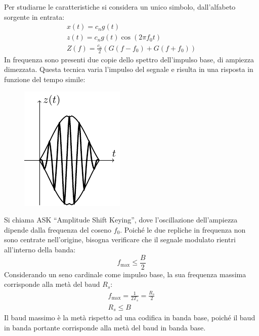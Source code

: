 \documentclass{article}
\numberwithin{equation}{subsection}
\begin{document}
Per studiarne le caratteristiche si considera un unico simbolo, dall'alfabeto sorgente in entrata: 
\begin{gather*}
    x(t)=c_ng(t)\\
    z(t)=c_ng(t)\cos(2\pi f_0t)\\
    Z(f)=\displaystyle\frac{c_n}{2}\left(G(f-f_0)+G(f+f_0)\right)
\end{gather*}
In frequenza sono presenti due copie dello spettro dell'impulso base, di ampiezza dimezzata. 
Questa tecnica varia l'impulso del segnale e risulta in una risposta in funzione del tempo simile:
\begin{figure}[H]%
    \centering
    \includegraphics{ask.pdf}
\end{figure}
Si chiama ASK ``Amplitude Shift Keying'', dove l'oscillazione dell'ampiezza dipende dalla frequenza del coseno $f_0$. 
Poiché le due repliche in frequenza non sono centrate nell'origine, bisogna verificare che il segnale modulato rientri all'interno della banda:
\begin{equation*}
    f_{\max}\leq \displaystyle\frac{B}{2}
\end{equation*}
Considerando un seno cardinale come impulso base, la sua frequenza massima corrisponde alla metà del baud $R_s$:
\begin{gather*}
    f_{\max}=\displaystyle\frac{1}{2T_s}=\frac{R_s}{2}\\
    R_s\leq B
\end{gather*}
Il baud massimo è la metà rispetto ad una codifica in banda base, poiché il baud in banda portante corrisponde alla metà del baud in banda base. 
\end{document}
